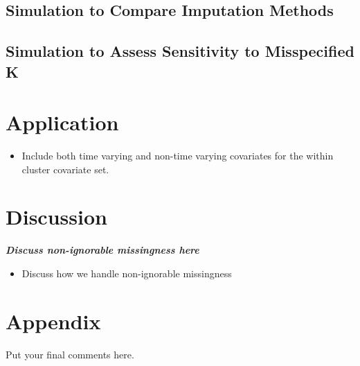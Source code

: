 \documentclass[useAMS,referee]{biom}
\begin{document}
\subsection{Simulation to Compare Imputation Methods}

\subsection{Simulation to Assess Sensitivity to Misspecified K}

\newpage

\section{Application}
\label{s:app}

\begin{itemize}

\item Include both time varying and non-time varying covariates for the within cluster covariate set. 

\end{itemize}

\newpage

\section{Discussion}
\label{s:discuss}

\textit{\textbf{Discuss non-ignorable missingness here}}


\begin{itemize}

\item Discuss how we handle non-ignorable missingness 

\end{itemize}


\section{Appendix}

Put your final comments here. 


\backmatter
\end{document}
